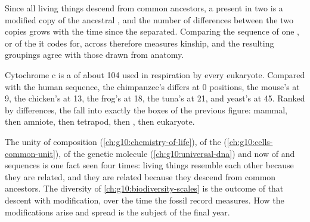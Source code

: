 \begin{proposition}\label{prop:g10:common-ancestry:molecular}
Since all living things descend from common ancestors, a  present
in two  is a modified copy of the ancestral , and the
number of differences between the two copies grows with the time since
the  separated. Comparing the sequence of one , or of the
 it codes for, across  therefore measures kinship, and
the resulting groupings agree with those drawn from anatomy.
\end{proposition}
\admitted

\begin{example}[Cytochrome c]\label{ex:g10:common-ancestry:cytochrome}
Cytochrome c is a  of about 104  used in
respiration by every eukaryote. Compared with the human sequence, the
chimpanzee's differs at 0 positions, the mouse's at 9, the chicken's
at 13, the frog's at 18, the tuna's at 21, and yeast's at 45. Ranked
by differences, the  fall into exactly the boxes of the
previous figure: mammal, then amniote, then tetrapod, then ,
then eukaryote.
\end{example}

\begin{remark}\label{rem:g10:common-ancestry:unity}
The unity of composition (\cref{ch:g10:chemistry-of-life}), of the 
(\cref{ch:g10:cells-common-unit}), of the genetic molecule
(\cref{ch:g10:universal-dna}) and now of  and  sequences
is one fact seen four times: living things resemble each other because
they are related, and they are related because they descend from
common ancestors. The diversity of \cref{ch:g10:biodiversity-scales}
is the outcome of that descent with modification, over the time the
fossil record measures. How the modifications arise and spread is the
subject of the final year.
\end{remark}

